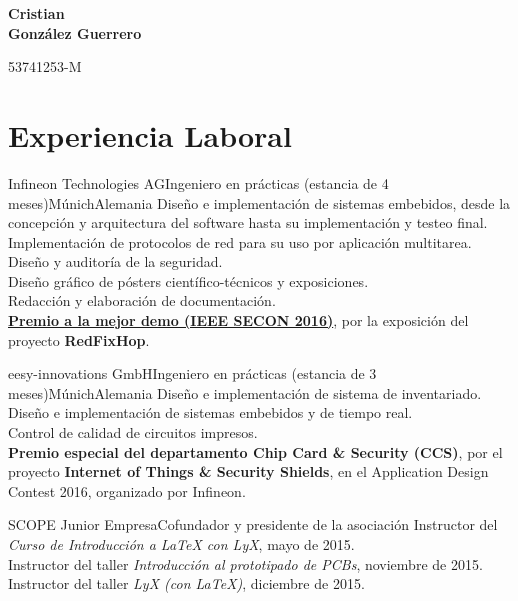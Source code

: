 \documentclass[11pt,a4paper,sans,spanish]{moderncv}
\begin{document}
\begin{minipage}[c]{\textwidth-110pt-0.5em}
    \begin{flushright}
        \textbf{\Huge{Cristian\\\vspace{4pt}González Guerrero}}

        \vspace{4pt}
        \small{53741253-M}
    \end{flushright}
\end{minipage}
\vspace{-5em}

\makecvtitle

\section{Experiencia Laboral}

{Infineon Technologies AG}{Ingeniero en prácticas (estancia de 4 meses)}{Múnich}{Alemania}
{Diseño e implementación de sistemas embebidos, desde la concepción y arquitectura del software hasta su implementación y testeo final.\\
Implementación de protocolos de red para su uso por aplicación multitarea.\\
Diseño y auditoría de la seguridad.\\
Diseño gráfico de pósters científico-técnicos y exposiciones.\\
Redacción y elaboración de documentación.\\
\href{http://secon2016.ieee-secon.org/content/demos-session}{\textbf{Premio a la mejor demo (IEEE SECON 2016)}}, por la exposición del proyecto \textbf{RedFixHop}.
}

{eesy-innovations GmbH}{Ingeniero en prácticas (estancia de 3 meses)}{Múnich}{Alemania}
{Diseño e implementación de sistema de inventariado.\\
Diseño e implementación de sistemas embebidos y de tiempo real.\\
Control de calidad de circuitos impresos.\\
\textbf{Premio especial del departamento Chip Card \& Security (CCS)}, por el proyecto \textbf{Internet of Things \& Security Shields}, en el Application Design Contest 2016, organizado por Infineon.}

{SCOPE Junior Empresa}{Cofundador y presidente de la asociación}{}{}
{Instructor del \emph{Curso de Introducción a LaTeX con LyX}, mayo de 2015.\\
Instructor del taller \emph{Introducción al prototipado de PCBs}, noviembre de 2015.\\
Instructor del taller \emph{LyX (con LaTeX)}, diciembre de 2015.
}
\end{document}
